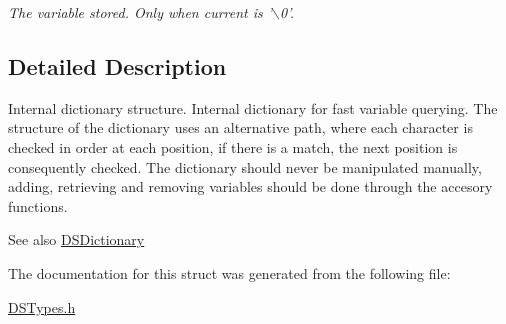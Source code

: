 \begin{DoxyCompactItemize}
\begin{DoxyCompactList}\small\item\em The variable stored. Only when current is '$\backslash$0'. \item\end{DoxyCompactList}\end{DoxyCompactItemize}


\subsection{Detailed Description}
Internal dictionary structure. Internal dictionary for fast variable querying. The structure of the dictionary uses an alternative path, where each character is checked in order at each position, if there is a match, the next position is consequently checked. The dictionary should never be manipulated manually, adding, retrieving and removing variables should be done through the accesory functions.

\begin{DoxySeeAlso}{See also}
\hyperlink{struct_d_s_dictionary}{DSDictionary} 
\end{DoxySeeAlso}


The documentation for this struct was generated from the following file:\begin{DoxyCompactItemize}
\item 
\hyperlink{_d_s_types_8h}{DSTypes.h}\end{DoxyCompactItemize}
